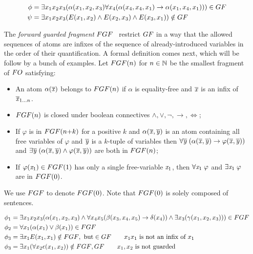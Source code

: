 \begin{example}
  \begin{align*}
  \phi &= \exists{x_{1}x_{2}x_{3}} (\alpha(x_{1}, x_{2}, x_{3}) \and \forall x_{4}(\alpha(x_{4}, x_{4}, x_{1}) \to \alpha(x_{1}, x_{4}, x_{1}))) \in \GF \\
  \psi &= \exists{x_{1}x_{2}x_{3}} (E(x_{1}, x_{2}) \land E(x_{2}, x_{3}) \land E(x_{3}, x_{1})) \notin GF
  \end{align*}
\end{example}

The \emph{forward guarded fragment} $\FGF$~\cite[Sec. 3.1]{Bednarczyk21} restrict $\GF$ in a way that the allowed sequences of atoms are infixes of the sequence of already-introduced variables in the order of their quantification.
A formal definition comes next, which will be follow by a bunch of examples.
Let $\FGF(n)$ for $n \in {\mathbb{N}}$ be the smallest fragment of $\FO$ satisfying:
\begin{itemize}\itemsep0em
    \item An atom $\alpha(\overline{\mathit{x}})$ belongs to $\FGF(n)$ if $\alpha$ is equality-free and $\overline{\mathit{x}}$ is an infix of $\overline{\mathit{x}}_{1\ldots n}$.
    \item $\FGF(n)$ is closed under boolean connectives $\land, \lor, \neg, \to, \iff$;
    \item If $\varphi$ is in $\FGF(n{+}k)$ for a positive $k$ and $\alpha(\overline{\mathit{x}}, \overline{\mathit{y}})$ is an atom containing all free variables of $\varphi$ and $\overline{\mathit{y}}$ is a $k$-tuple of variables then  $\forall{\overline{\mathit{y}}} \; (\alpha(\overline{\mathit{x}}, \overline{\mathit{y}}) \to \varphi(\overline{\mathit{x}}, \overline{\mathit{y}}))$ and $\exists{\overline{\mathit{y}}} \; (\alpha(\overline{\mathit{x}}, \overline{\mathit{y}}) \land \varphi(\overline{\mathit{x}}, \overline{\mathit{y}}))$ are both in $\FGF(n)$; 
    \item If $\varphi(\varx_1) \in \FGF(1)$ has only a single free-variable $\mathit{x}_1$, then $\forall{\mathit{x}_1}\; \varphi$ and $\exists{\mathit{x}_1}\; \varphi$ are in $\FGF(0)$.
\end{itemize}
We use $\FGF$ to denote $\FGF(0)$. 
Note that $\FGF(0)$ is solely composed of sentences. 

\begin{example}
  \begin{align*}
    \phi_{1} &= \exists{x_1x_{2}x_{3}}(\alpha(x_{1}, x_{2}, x_{3}) \land \forall{x_{4}x_{5}}(\beta(x_{3}, x_{4}, x_{5}) \to \delta(x_{4})) \land \exists{x_{3}}(\gamma(x_{1}, x_{2}, x_{3}))) \in \FGF \\
    \phi_{2} &= \forall{x_{1}} (\alpha(x_{1}) \lor \beta(x_{1})) \in \FGF \\
    \phi_{3} &= \exists{x_{1}} E(x_{1}, x_{1}) \notin \FGF,\ \text{but} \in \GF \qquad \text{$x_1x_1$ is not an infix of $x_1$} \\
    \phi_{3} &= \exists{x_{1}} (\forall{x_{2}} \epsilon(x_{1}, x_{2})) \notin \FGF, \GF \qquad \text{$x_{1}, x_{2}$ is not guarded}
  \end{align*}
\end{example}

